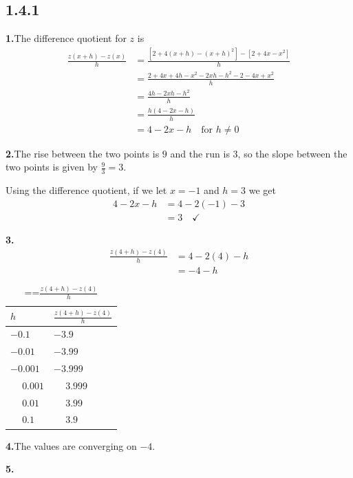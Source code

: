 \documentclass[10pt,oneside,]{book}
\theoremstyle{plain}
\theoremstyle{definition}
\numberwithin{equation}{section}
\newcommand{\fe}[2]{#1\mathopen{}\left(#2\right)\mathclose{}}
\begin{document}
\subsection*{1.4.1 }
\noindent\textbf{1.}\quad{}The difference quotient for \(z\) is \begin{align*}
\frac{\fe{z}{x+h}-\fe{z}{x}}{h}&=\frac{\left[2+4(x+h)-(x+h)^2\right]-\left[2+4x-x^2\right]}{h}\\
&=\frac{2+4x+4h-x^2-2xh-h^2-2-4x+x^2}{h}\\
&=\frac{4h-2xh-h^2}{h}\\
&=\frac{h(4-2x-h)}{h}\\
&=4-2x-h\quad\text{for $h\neq0$}
\end{align*}%
\par\smallskip
\noindent\textbf{2.}\quad{}The rise between the two points is \(9\) and the run is \(3\), so the slope between the two points is given by \(\frac{9}{3}=3\).%
\par
Using the difference quotient, if we let \(x=-1\) and \(h=3\) we get\begin{align*}
4-2x-h&=4-2(-1)-3\\
&=3\quad\checkmark
\end{align*}%
\par\smallskip
\noindent\textbf{3.}\quad{}\begin{align*}
\frac{\fe{z}{4+h}-\fe{z}{4}}{h}&=4-2(4)-h\\
&=-4-h
\end{align*}%
\begin{table}
\centering
\caption{\binoppenalty=\maxdimen \relpenalty=\maxdimen \(\frac{\fe{z}{4+h}-\fe{z}{4}}{h}\)\label{table-4}}
\begin{tabular}{ll}
\toprule
\(h\)&\(\frac{\fe{z}{4+h}-\fe{z}{4}}{h}\)\\
\midrule
\(-0.1\)&\(-3.9\)\\
\(-0.01\)&\(-3.99\)\\
\(-0.001\)&\(-3.999\)\\
\(\phantom{-}0.001\)&\(\phantom{-}3.999\)\\
\(\phantom{-}0.01\)&\(\phantom{-}3.99\)\\
\(\phantom{-}0.1\)&\(\phantom{-}3.9\)\\
\bottomrule
\end{tabular}
\end{table}
\par\smallskip
\noindent\textbf{4.}\quad{}The values are converging on \(-4\).%
\par\smallskip
\noindent\textbf{5.}
\end{document}
